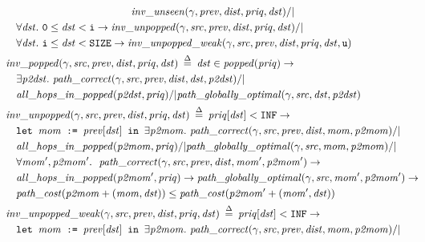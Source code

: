 \begin{figure}
\begin{equation*}
\begin{split}
&\hspace{11em}\m{inv\_unseen}(\gamma, \m{prev}, \m{dist}, \m{priq}, \m{dst}) /| \null \\
&\forall \m{dst}.~\texttt{0} \le \m{dst} < \texttt{i} -> \m{inv\_unpopped}(\gamma, \m{src}, \m{prev}, \m{dist}, \m{priq}, \m{dst}) /| \null \\
&\forall \m{dst}.~\texttt{i} \le \m{dst} < \texttt{SIZE} -> \m{inv\_unpopped\_weak}(\gamma, \m{src}, \m{prev}, \m{dist}, \m{priq}, \m{dst}, \texttt{u}) \\
\vspace{1em}
&\!\!\!\!\!\!\m{inv\_popped}(\gamma, \m{src}, \m{prev}, \m{dist}, \m{priq}, \m{dst}) \; \defeq \; \m{dst} \in \m{popped}(\m{priq}) -> \\
&\exists \m{p2dst}.~\m{path\_correct}(\gamma, \m{src}, \m{prev}, \m{dist}, \m{dst}, \m{p2dst}) /| \null \\
&\m{all\_hops\_in\_popped}(\m{p2dst}, \m{priq}) /|
\m{path\_globally\_optimal}(\gamma, \m{src}, \m{dst}, \m{p2dst}) \\
\vspace{1em}
&\!\!\!\!\!\!\m{inv\_unpopped}(\gamma, \m{src}, \m{prev}, \m{dist}, \m{priq}, \m{dst}) \; \defeq \; \m{priq}[\m{dst}] < \texttt{INF} -> \\
&\texttt{let } \m{mom} \texttt{ := } \m{prev}[\m{dst}] \texttt{ in } \exists \m{p2mom}.~\m{path\_correct}(\gamma, \m{src}, \m{prev}, \m{dist}, \m{mom}, \m{p2mom}) /| \null \\
&\m{all\_hops\_in\_popped}(\m{p2mom}, \m{priq}) /| \m{path\_globally\_optimal}(\gamma, \m{src}, \m{mom}, \m{p2mom}) /| \null \\
&\forall \m{mom', p2mom'}.~~\m{path\_correct}(\gamma, \m{src}, \m{prev}, \m{dist}, \m{mom'}, \m{p2mom'}) -> \\
&\m{all\_hops\_in\_popped}(\m{p2mom'}, \m{priq}) -> 
\m{path\_globally\_optimal}(\gamma, \m{src}, \m{mom'}, \m{p2mom'}) -> \\
&\m{path\_cost}(\m{p2mom} + \m{(mom, dst)}) \le \m{path\_cost}(\m{p2mom'} + \m{(mom', dst)}) \\
\vspace{1em}
&\!\!\!\!\!\!\m{inv\_unpopped\_weak}(\gamma, \m{src}, \m{prev}, \m{dist}, \m{priq}, \m{dst}) \; \defeq \; \m{priq}[\m{dst}] < \texttt{INF} -> \\
&\texttt{let } \m{mom} \texttt{ := } \m{prev}[\m{dst}] \texttt{ in } \exists \m{p2mom}.~\m{path\_correct}(\gamma, \m{src}, \m{prev}, \m{dist}, \m{mom}, \m{p2mom}) /| \null \\

\end{split}
\end{equation*}
\end{figure}
